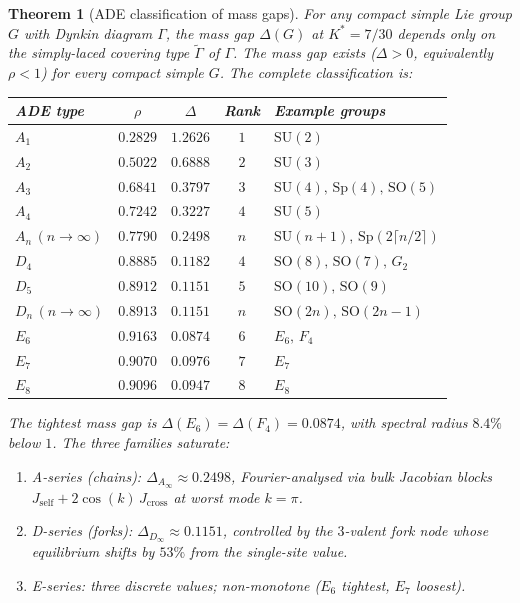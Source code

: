 \documentclass[11pt,a4paper]{article}
\let\hline\midrule
\newtheorem{theorem}{Theorem}[section]
\theoremstyle{definition}
\theoremstyle{remark}
\newcommand{\SU}{\mathrm{SU}}
\begin{document}
\begin{theorem}[ADE classification of mass gaps]\label{thm:ade_classification}
For any compact simple Lie group $G$ with Dynkin diagram $\Gamma$, the mass gap $\Delta(G)$ at $K^*=7/30$ depends only on the simply-laced covering type $\widetilde{\Gamma}$ of $\Gamma$. The mass gap exists ($\Delta>0$, equivalently $\rho<1$) for every compact simple $G$. The complete classification is:
\begin{center}
\begin{tabular}{lcccl}
\hline
ADE type & $\rho$ & $\Delta$ & Rank & Example groups \\
\hline
$A_1$ & $0.2829$ & $1.2626$ & $1$ & $\SU(2)$ \\
$A_2$ & $0.5022$ & $0.6888$ & $2$ & $\SU(3)$ \\
$A_3$ & $0.6841$ & $0.3797$ & $3$ & $\SU(4),\,\mathrm{Sp}(4),\,\mathrm{SO}(5)$ \\
$A_4$ & $0.7242$ & $0.3227$ & $4$ & $\SU(5)$ \\
$A_n\,(n\to\infty)$ & $0.7790$ & $0.2498$ & $n$ & $\SU(n\!+\!1),\,\mathrm{Sp}(2\lceil n/2\rceil)$ \\
\hline
$D_4$ & $0.8885$ & $0.1182$ & $4$ & $\mathrm{SO}(8),\,\mathrm{SO}(7),\,G_2$ \\
$D_5$ & $0.8912$ & $0.1151$ & $5$ & $\mathrm{SO}(10),\,\mathrm{SO}(9)$ \\
$D_n\,(n\to\infty)$ & $0.8913$ & $0.1151$ & $n$ & $\mathrm{SO}(2n),\,\mathrm{SO}(2n\!-\!1)$ \\
\hline
$E_6$ & $0.9163$ & $0.0874$ & $6$ & $E_6,\,F_4$ \\
$E_7$ & $0.9070$ & $0.0976$ & $7$ & $E_7$ \\
$E_8$ & $0.9096$ & $0.0947$ & $8$ & $E_8$ \\
\hline
\end{tabular}
\end{center}
The tightest mass gap is $\Delta(E_6)=\Delta(F_4)=0.0874$, with spectral radius $8.4\%$ below $1$. The three families saturate:
\begin{enumerate}[nosep]
\item \emph{A-series (chains)}: $\Delta_{A_\infty}\approx 0.2498$, Fourier-analysed via bulk Jacobian blocks $J_{\mathrm{self}}+2\cos(k)\,J_{\mathrm{cross}}$ at worst mode $k=\pi$.
\item \emph{D-series (forks)}: $\Delta_{D_\infty}\approx 0.1151$, controlled by the $3$-valent fork node whose equilibrium shifts by $53\%$ from the single-site value.
\item \emph{E-series}: three discrete values; non-monotone ($E_6$ tightest, $E_7$ loosest).
\end{enumerate}
\end{theorem}
\end{document}
